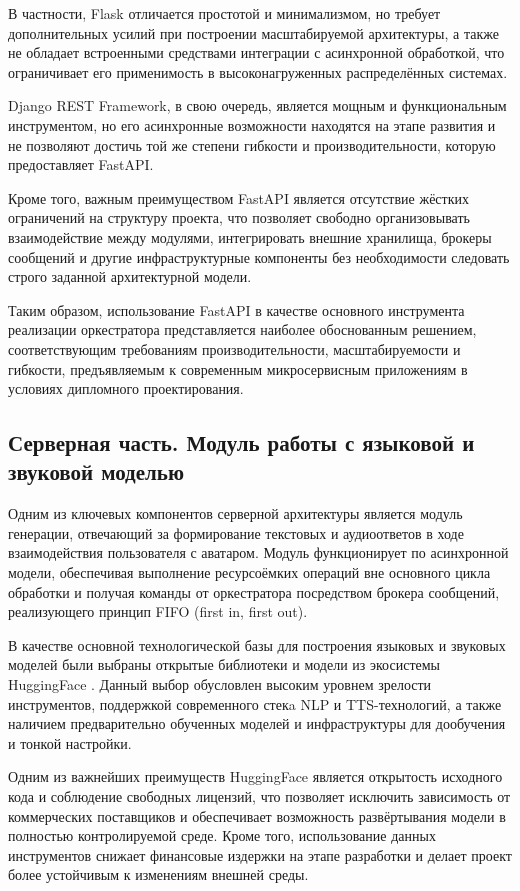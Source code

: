 В частности, Flask отличается простотой и минимализмом,
но требует дополнительных усилий при построении масштабируемой архитектуры,
а также не обладает встроенными средствами интеграции
с асинхронной обработкой, что ограничивает его применимость
в высоконагруженных распределённых системах.

Django REST Framework, в свою очередь,
является мощным и функциональным инструментом,
но его асинхронные возможности находятся на этапе развития
и не позволяют достичь той же степени гибкости и производительности,
которую предоставляет FastAPI.

Кроме того, важным преимуществом FastAPI является
отсутствие жёстких ограничений на структуру проекта,
что позволяет свободно организовывать взаимодействие между модулями,
интегрировать внешние хранилища, брокеры сообщений
и другие инфраструктурные компоненты без необходимости
следовать строго заданной архитектурной модели.

Таким образом, использование FastAPI в качестве
основного инструмента реализации оркестратора
представляется наиболее обоснованным решением,
соответствующим требованиям производительности, масштабируемости
и гибкости, предъявляемым к современным микросервисным приложениям
в условиях дипломного проектирования.

\subsection{Серверная часть. Модуль работы с языковой и звуковой моделью}

Одним из ключевых компонентов серверной архитектуры
является модуль генерации, отвечающий за формирование текстовых и аудиоответов
в ходе взаимодействия пользователя с аватаром.
Модуль функционирует по асинхронной модели,
обеспечивая выполнение ресурсоёмких операций вне основного цикла обработки
и получая команды от оркестратора посредством брокера сообщений,
реализующего принцип FIFO (first in, first out).

В качестве основной технологической базы
для построения языковых и звуковых моделей
были выбраны открытые библиотеки и модели
из экосистемы HuggingFace \cite{HugginFaceTransformersLib}.
Данный выбор обусловлен высоким уровнем зрелости инструментов,
поддержкой современного стекa NLP и TTS-технологий,
а также наличием предварительно обученных моделей
и инфраструктуры для дообучения и тонкой настройки.

Одним из важнейших преимуществ HuggingFace
является открытость исходного кода и соблюдение
свободных лицензий, что позволяет исключить зависимость
от коммерческих поставщиков и обеспечивает возможность
развёртывания модели в полностью контролируемой среде.
Кроме того, использование данных инструментов
снижает финансовые издержки на этапе разработки
и делает проект более устойчивым к изменениям внешней среды.

